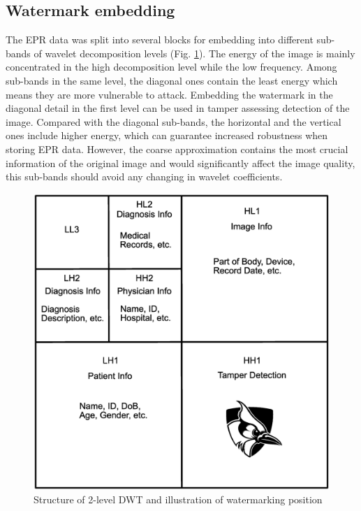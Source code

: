 \documentclass[letterpaper, 10 pt, conference]{ieeeconf}  %
\begin{document}
\subsection{Watermark embedding}
The EPR data was split into several blocks for embedding into different sub-bands of wavelet decomposition levels  (Fig. \ref{WMPos}). The energy of the image is mainly concentrated in the high decomposition level while the low frequency. Among sub-bands in the same level, the diagonal ones contain the least energy which means they are more vulnerable to attack. Embedding the watermark in the diagonal detail in the first level can be used in tamper assessing detection of the image. Compared with the diagonal sub-bands, the horizontal and the vertical ones include higher energy, which can guarantee increased robustness when storing EPR data. However, the coarse approximation contains the most crucial information of the original image and would significantly affect the image quality, this sub-bands should avoid any changing in wavelet coefficients.
\begin{figure}[htbp]
	\centering
	\includegraphics[width=1\linewidth]{WMPos}
	\caption{Structure of 2-level DWT and illustration of watermarking position}
	\label{WMPos}
\end{figure}
\\
\end{document}
